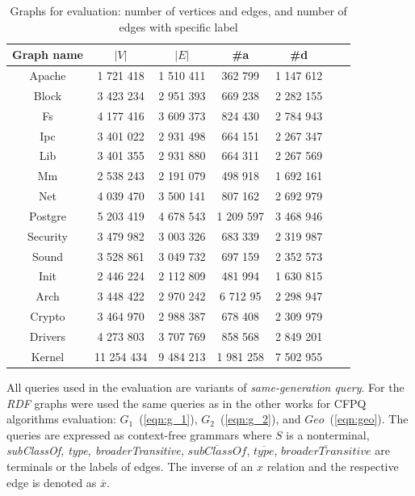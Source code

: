     \begin{table}[h!]
    \centering
    \begin{tabular}{| c | c | c | c | c | c | c |}
         \hline
         Graph name & $|V|$ & $|E|$ & \#a & \#d \\
         \hline
         \hline
         Apache         & 1 721 418 & 1 510 411  & 362 799 & 1 147 612 \\
         Block          & 3 423 234 & 2 951 393  & 669 238 & 2 282 155 \\
         Fs             & 4 177 416 & 3 609 373 & 824 430 & 2 784 943 \\
         Ipc            & 3 401 022 & 2 931 498 & 664 151 & 2 267 347 \\
         Lib            & 3 401 355 & 2 931 880 & 664 311 & 2 267 569 \\
         Mm             & 2 538 243 & 2 191 079 & 498 918 & 1 692 161 \\
         Net            & 4 039 470 & 3 500 141 & 807 162 & 2 692 979 \\
         Postgre        & 5 203 419 & 4 678 543 & 1 209 597 & 3 468 946 \\
         Security       & 3 479 982 & 3 003 326 & 683 339 & 2 319 987 \\
         Sound          & 3 528 861 & 3 049 732 & 697 159 & 2 352 573 \\
         Init           & 2 446 224 & 2 112 809 & 481 994 & 1 630 815 \\
         Arch           & 3 448 422 & 2 970 242 & 6 712 95 & 2 298 947 \\
         Crypto         & 3 464 970 & 2 988 387 & 678 408 & 2 309 979 \\
         Drivers        & 4 273 803 & 3 707 769 & 858 568 & 2 849 201 \\
         Kernel         & 11 254 434& 9 484 213  & 1 981 258 & 7 502 955 \\
         \hline
    \end{tabular}
    \caption{Graphs for evaluation: number of vertices and edges, and number of edges with specific label}
    \label{tab:graphs_for_evaluation_stat}
\end{table}

    All queries used in the evaluation are variants of \textit{same-generation query}. For the \textit{RDF} graphs were used the same queries as in the other works for CFPQ algorithms evaluation: $G_1$~(\ref{eqn:g_1}), $G_2$~(\ref{eqn:g_2}), and $Geo$~(\ref{eqn:geo}). The queries are expressed as context-free grammars where $S$ is a nonterminal, \textit{subClassOf, type, broaderTransitive, }$ \overline{\textit{subClassOf}}$, $\overline{\textit{type}}$, $\overline{\textit{broaderTransitive}}$ are terminals or the labels of edges. The inverse of an $x$ relation and the respective edge is denoted as $\overline{x}$.
    
